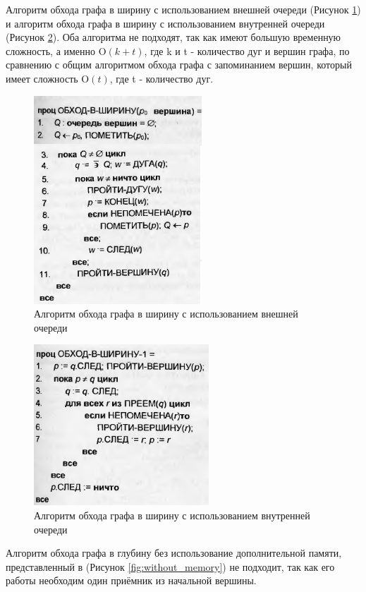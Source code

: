 Алгоритм обхода графа в ширину с использованием внешней очереди (Рисунок \ref{fig:outer_queue}) и алгоритм обхода графа в ширину с использованием внутренней очереди (Рисунок \ref{fig:internal _queue}). Оба алгоритма не подходят, так как имеют большую временную сложность, а именно O$(k + t)$, где k и t - количество дуг и вершин графа, по сравнению с общим алгоритмом обхода графа с запоминанием вершин, который имеет сложность O$(t)$, где t - количество дуг.

\begin{figure}[h!]
    \centering
    \includegraphics[width=0.4\linewidth]{ResearchNotes/rndhpc_int_edt_2023_01_10/outer_queue.png}
    \caption{Алгоритм обхода графа в ширину с использованием внешней очереди}
    \label{fig:outer_queue}
\end{figure}

\begin{figure}[h!]
    \centering
    \includegraphics[width=0.4\linewidth]{ResearchNotes/rndhpc_int_edt_2023_01_10/internal_queue.png}
    \caption{Алгоритм обхода графа в ширину с использованием внутренней очереди}
    \label{fig:internal _queue}
\end{figure}

Алгоритм обхода графа в глубину без использование дополнительной памяти, представленный в (Рисунок \ref{fig:without_memory}) не подходит, так как его работы необходим один приёмник из начальной вершины.

